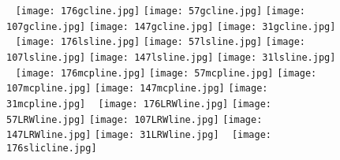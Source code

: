 \documentclass[nomlist,masters]{seuthesix}
\begin{document}
\begin{figure}[H]
\centering 
\texttt{[image: 176gcline.jpg]}%
\hspace{0.001\textwidth}
\texttt{[image: 57gcline.jpg]}
\hspace{0.001\textwidth}
\texttt{[image: 107gcline.jpg]}
\hspace{0.001\textwidth}
\texttt{[image: 147gcline.jpg]}
\hspace{0.001\textwidth}
\texttt{[image: 31gcline.jpg]}%
\vfill
\vspace{6pt}
\centering 
\texttt{[image: 176lsline.jpg]}
\hspace{0.001\textwidth}
\texttt{[image: 57lsline.jpg]}
\hspace{0.001\textwidth}
\texttt{[image: 107lsline.jpg]}
\hspace{0.001\textwidth}
\texttt{[image: 147lsline.jpg]}
\hspace{0.001\textwidth}
\texttt{[image: 31lsline.jpg]}
\vfill
\vspace{6pt}
\centering 
\texttt{[image: 176mcpline.jpg]}
\hspace{0.001\textwidth}
\texttt{[image: 57mcpline.jpg]}
\hspace{0.001\textwidth}
\texttt{[image: 107mcpline.jpg]}
\hspace{0.001\textwidth}
\texttt{[image: 147mcpline.jpg]}
\hspace{0.001\textwidth}
\texttt{[image: 31mcpline.jpg]}
\vfill
\vspace{6pt}
\centering 
\texttt{[image: 176LRWline.jpg]}
\hspace{0.001\textwidth}
\texttt{[image: 57LRWline.jpg]}
\hspace{0.001\textwidth}
\texttt{[image: 107LRWline.jpg]}
\hspace{0.001\textwidth}
\texttt{[image: 147LRWline.jpg]}
\hspace{0.001\textwidth}
\texttt{[image: 31LRWline.jpg]}
\vfill
\vspace{6pt}
\centering 
\texttt{[image: 176slicline.jpg]}
\hspace{0.001\textwidth}

\end{figure}
\end{document}
